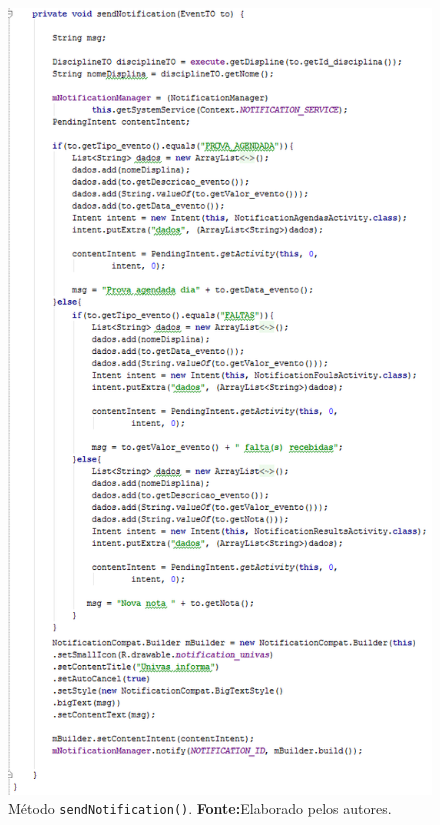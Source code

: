		\begin{figure}[h!] 
			\centerline{\includegraphics[scale=0.55]{./imagens/2_q_metodologico/4_procedimentos_resultados/42_aplicativo/app13.png}}
			\caption[Método sendNotification()]{Método \texttt{sendNotification()}.
			\textbf{Fonte:}Elaborado pelos autores.}
			\label{fig:app13}
		\end{figure}
	
